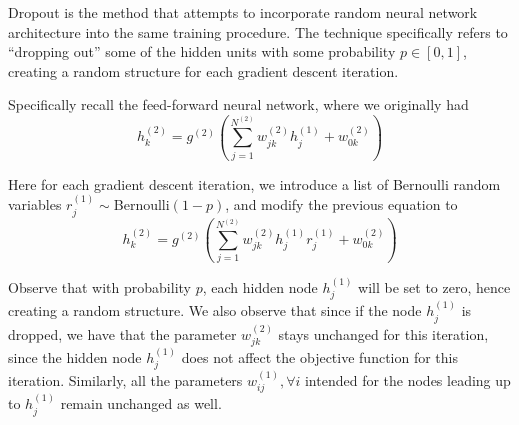 Dropout is the method that attempts to incorporate 
random neural network architecture into 
the same training procedure.
The technique specifically refers to ``dropping out''
some of the hidden units with some probability $p \in [0,1]$,
creating a random structure for each gradient descent 
iteration.

Specifically recall the feed-forward neural network, 
where we originally had
%
\begin{equation*}
  h^{(2)}_k = g^{(2)}
    \left(\sum_{j=1}^{N^{(2)}} w_{jk}^{(2)} h_j^{(1)} + 
      w^{(2)}_{0k} \right)
\end{equation*}

Here for each gradient descent iteration,
we introduce a list of Bernoulli random variables
$r^{(1)}_j \sim $Bernoulli$(1-p)$,
and modify the previous equation to
%
\begin{equation*}
  h^{(2)}_k = g^{(2)}
    \left(\sum_{j=1}^{N^{(2)}} w_{jk}^{(2)} 
    h_j^{(1)} r_j^{(1)}
     + w^{(2)}_{0k} \right)
\end{equation*}

Observe that with probability $p$, 
each hidden node $h_j^{(1)}$ will be set to zero,
hence creating a random structure.
We also observe that since if the node $h_j^{(1)}$
is dropped, we have that the parameter 
$w_{jk}^{(2)}$ stays unchanged for this iteration,
since the hidden node $h_j^{(1)}$ does not 
affect the objective function for this iteration.
Similarly, all the parameters 
$w_{ij}^{(1)},\forall i$ intended for 
the nodes leading up to $h_j^{(1)}$ 
remain unchanged as well.

















